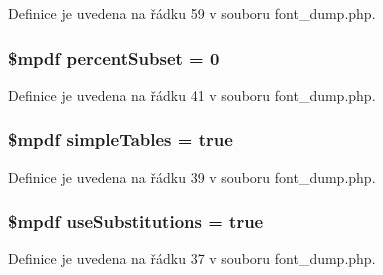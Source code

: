 Definice je uvedena na řádku 59 v souboru font\-\_\-dump.\-php.

\hypertarget{font__dump_8php_a6a35a9ff62c890b69a1774f6435e4e6d}{
\subsubsection[{percent\-Subset}]{\setlength{\rightskip}{0pt plus 5cm}\$mpdf percent\-Subset = 0}}\label{font__dump_8php_a6a35a9ff62c890b69a1774f6435e4e6d}


Definice je uvedena na řádku 41 v souboru font\-\_\-dump.\-php.

\hypertarget{font__dump_8php_a87bf4d3d8114a506fea7f0fc5f0714f6}{
\subsubsection[{simple\-Tables}]{\setlength{\rightskip}{0pt plus 5cm}\$mpdf simple\-Tables = true}}\label{font__dump_8php_a87bf4d3d8114a506fea7f0fc5f0714f6}


Definice je uvedena na řádku 39 v souboru font\-\_\-dump.\-php.

\hypertarget{font__dump_8php_aa2ce4c2c0ab99d3365e4d7366a9be33a}{
\subsubsection[{use\-Substitutions}]{\setlength{\rightskip}{0pt plus 5cm}\$mpdf use\-Substitutions = true}}\label{font__dump_8php_aa2ce4c2c0ab99d3365e4d7366a9be33a}


Definice je uvedena na řádku 37 v souboru font\-\_\-dump.\-php.


